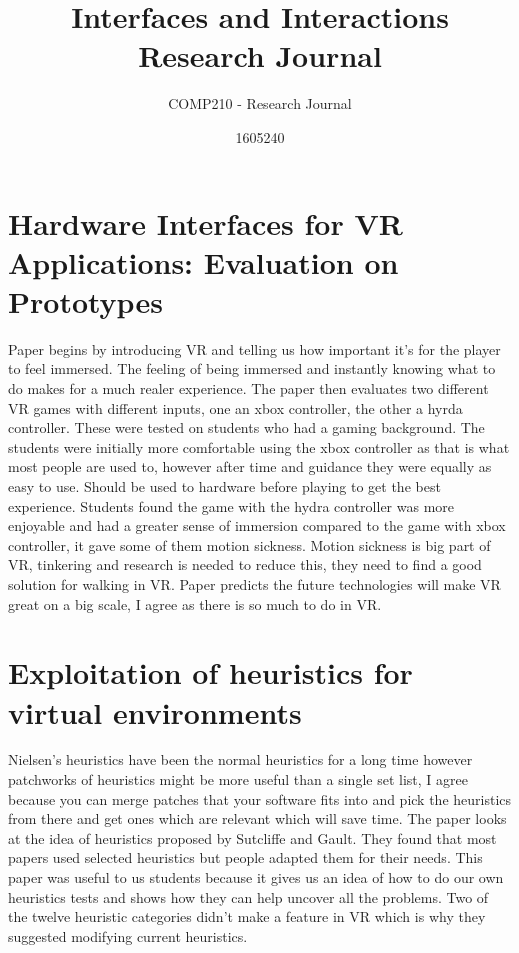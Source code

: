 \documentclass{scrartcl}
\title{Interfaces and Interactions Research Journal}
\subtitle{COMP210 - Research Journal}
\author{1605240}
\begin{document}
\maketitle

\section{Hardware Interfaces for VR Applications: Evaluation on Prototypes \cite{mentzelopoulos2015hardware}}
Paper begins by introducing VR and telling us how important it's for the player to feel immersed. The feeling of being immersed and instantly knowing what to do makes for a much realer experience. The paper then evaluates two different VR games with different inputs, one an xbox controller, the other a hyrda controller. These were tested on students who had a gaming background. The students were initially more comfortable using the xbox controller as that is what most people are used to, however after time and guidance they were equally as easy to use. Should be used to hardware before playing to get the best experience. Students found the game with the hydra controller was more enjoyable and had a greater sense of immersion compared to the game with xbox controller, it gave some of them motion sickness. Motion sickness is big part of VR, tinkering and research is needed to reduce this, they need to find a good solution for walking in VR. Paper predicts the future technologies will make VR great on a big scale, I agree as there is so much to do in VR.

\section{Exploitation of heuristics for virtual environments \cite{hvannberg2012exploitation}}
Nielsen's heuristics have been the normal heuristics for a long time however patchworks of heuristics might be more useful than a single set list, I agree because you can merge patches that your software fits into and pick the heuristics from there and get ones which are relevant which will save time. The paper looks at the idea of heuristics proposed by Sutcliffe and Gault. They found that most papers used selected heuristics but people  adapted them for their needs. This paper was useful to us students because it gives us an idea of how to do our own heuristics tests and shows how they can help uncover all the problems. Two of the twelve heuristic categories didn't make a feature in VR which is why they suggested modifying current heuristics.
\end{document}
